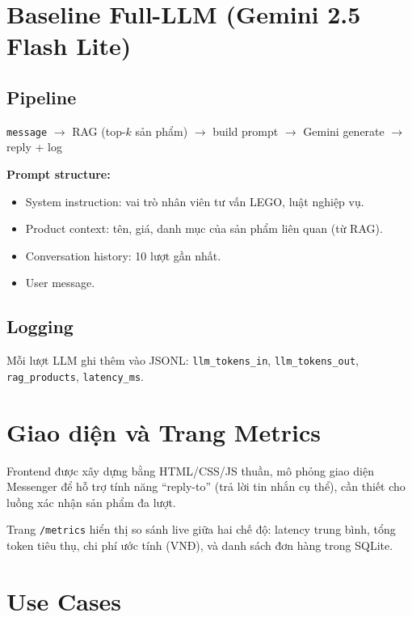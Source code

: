\documentclass[12pt, a4paper]{report}
\begin{document}
\section{Baseline Full-LLM (Gemini 2.5 Flash Lite)}

\subsection{Pipeline}

\begin{center}
\texttt{message} $\rightarrow$ RAG (top-$k$ sản phẩm) $\rightarrow$
build prompt $\rightarrow$ Gemini generate $\rightarrow$ reply + log
\end{center}

\textbf{Prompt structure:}
\begin{itemize}
  \item System instruction: vai trò nhân viên tư vấn LEGO, luật nghiệp vụ.
  \item Product context: tên, giá, danh mục của sản phẩm liên quan (từ RAG).
  \item Conversation history: 10 lượt gần nhất.
  \item User message.
\end{itemize}

\subsection{Logging}

Mỗi lượt LLM ghi thêm vào JSONL:
\texttt{llm\_tokens\_in}, \texttt{llm\_tokens\_out},
\texttt{rag\_products}, \texttt{latency\_ms}.

\section{Giao diện và Trang Metrics}

Frontend được xây dựng bằng HTML/CSS/JS thuần, mô phỏng giao diện
Messenger để hỗ trợ tính năng ``reply-to'' (trả lời tin nhắn cụ thể),
cần thiết cho luồng xác nhận sản phẩm đa lượt.

Trang \texttt{/metrics} hiển thị so sánh live giữa hai chế độ:
latency trung bình, tổng token tiêu thụ, chi phí ước tính (VNĐ),
và danh sách đơn hàng trong SQLite.

\section{Use Cases}
\label{sec:usecases}
\end{document}
